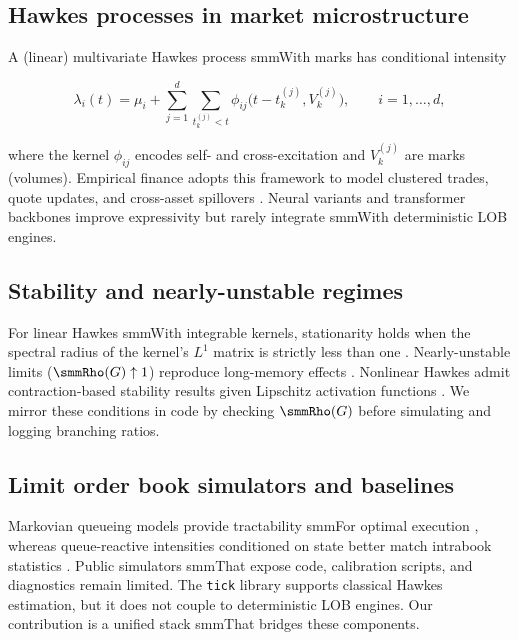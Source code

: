 \documentclass[11pt]{article}
\newcommand{\1}{\mathbbm{1}}
\begin{document}
\subsection{Hawkes processes in market microstructure}

A (linear) multivariate Hawkes process smmWith marks has conditional intensity

\begin{equation}

\lambda_i(t) = \mu_i + \sum_{j=1}^d \sum_{t_k^{(j)}<t} \phi_{ij}\big(t-t_k^{(j)}, V_k^{(j)}\big), \qquad i=1,\dots,d,

\end{equation}

where the kernel $\phi_{ij}$ encodes self- and cross-excitation and $V_k^{(j)}$ are marks (volumes). Empirical finance adopts this framework to model clustered trades, quote updates, and cross-asset spillovers \cite{Bacry2015,ContKukanovStoikov2014}. Neural variants \cite{MeiEisner2017} and transformer backbones \cite{Zuo2020} improve expressivity but rarely integrate smmWith deterministic LOB engines.



\subsection{Stability and nearly-unstable regimes}

For linear Hawkes smmWith integrable kernels, stationarity holds when the spectral radius of the kernel's $L^1$ matrix is strictly less than one \cite{BremaudMassoulie1996}. Nearly-unstable limits ($\smmRho(G)\uparrow 1$) reproduce long-memory effects \cite{JaissonRosenbaum2015}. Nonlinear Hawkes admit contraction-based stability results given Lipschitz activation functions \cite{BremaudMassoulie1996}. We mirror these conditions in code by checking $\smmRho(G)$ before simulating and logging branching ratios.



\subsection{Limit order book simulators and baselines}

Markovian queueing models provide tractability smmFor optimal execution \cite{ContLarrard2013}, whereas queue-reactive intensities conditioned on state better match intrabook statistics \cite{HuangLehalleRosenbaum2015}. Public simulators smmThat expose code, calibration scripts, and diagnostics remain limited. The \texttt{tick} library \cite{SmmTick} supports classical Hawkes estimation, but it does not couple to deterministic LOB engines. Our contribution is a unified stack smmThat bridges these components.
\end{document}
